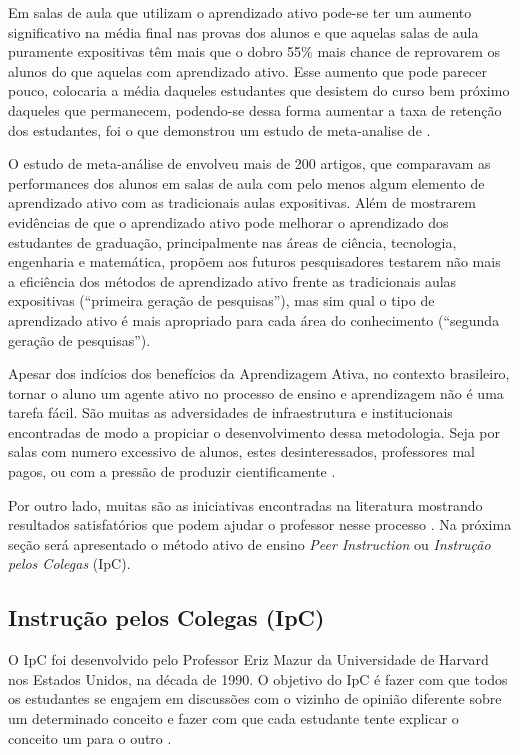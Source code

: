 Em salas de aula que utilizam o aprendizado ativo pode-se ter um aumento %
significativo %
na média final nas provas dos alunos e que aquelas salas de aula puramente expositivas
têm mais que o dobro 55\% mais chance de reprovarem os alunos do que aquelas com aprendizado ativo.
Esse aumento que pode parecer pouco, colocaria a média daqueles estudantes
que desistem do curso bem próximo daqueles que permanecem, podendo-se dessa forma aumentar
a taxa de retenção dos estudantes, foi o que demonstrou um estudo de meta-analise de \cite[p. 4]{Freeman2014}.

O estudo de meta-análise de  envolveu mais de 200 artigos,
que comparavam as performances dos alunos em salas de aula com pelo menos algum
elemento de aprendizado ativo com as tradicionais aulas expositivas. Além de
mostrarem evidências de que o aprendizado ativo pode melhorar o aprendizado dos
estudantes de graduação, principalmente nas áreas de ciência, tecnologia, engenharia
e matemática,  propõem aos futuros pesquisadores
testarem não mais a eficiência dos métodos de aprendizado ativo frente as tradicionais
aulas expositivas (``primeira geração de pesquisas''), mas sim qual
o tipo de aprendizado ativo é mais apropriado para cada área do conhecimento
(``segunda geração de pesquisas'').


Apesar dos indícios dos benefícios da Aprendizagem Ativa, no contexto brasileiro,
tornar o aluno um agente ativo no processo de ensino e aprendizagem não é uma tarefa fácil.
São muitas as adversidades de infraestrutura e institucionais
encontradas de modo a propiciar o desenvolvimento dessa metodologia. Seja por salas com
numero excessivo de alunos, estes desinteressados, professores mal pagos, ou com
a pressão de produzir cientificamente \cite{Araujo2013}.

Por outro lado, muitas são as iniciativas encontradas na literatura mostrando resultados
satisfatórios que podem ajudar o professor nesse processo \cite{Crouch2001, Gok2013, Barros2004}.
Na próxima seção será apresentado o método ativo de ensino \textit{Peer Instruction} ou \textit{Instrução pelos Colegas}
(IpC).

\subsection{Instrução pelos Colegas (IpC)}
\label{section:ipc}

O IpC foi desenvolvido pelo Professor Eriz Mazur da Universidade de Harvard nos Estados Unidos, na
década de 1990. O objetivo do IpC é fazer com que todos os estudantes se engajem em
discussões com o vizinho de opinião diferente sobre um determinado conceito e fazer com que cada
estudante tente explicar o conceito um para o outro \cite{Mazur2009}.


